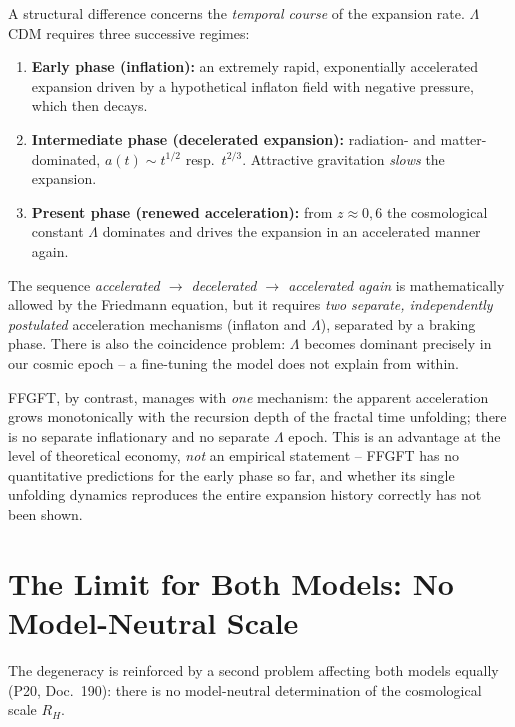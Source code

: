 A structural difference concerns the \emph{temporal course} of the
expansion rate. $\Lambda$CDM requires three successive regimes:

\begin{enumerate}
  \item \textbf{Early phase (inflation):} an extremely rapid, exponentially
        accelerated expansion driven by a hypothetical inflaton field with
        negative pressure, which then decays.
  \item \textbf{Intermediate phase (decelerated expansion):} radiation- and
        matter-dominated, $a(t) \sim t^{1/2}$ resp.\ $t^{2/3}$. Attractive
        gravitation \emph{slows} the expansion.
  \item \textbf{Present phase (renewed acceleration):} from $z \approx 0{,}6$
        the cosmological constant $\Lambda$ dominates and drives the
        expansion in an accelerated manner again.
\end{enumerate}

The sequence \emph{accelerated $\to$ decelerated $\to$ accelerated again} is
mathematically allowed by the Friedmann equation, but it requires \emph{two
separate, independently postulated} acceleration mechanisms (inflaton and
$\Lambda$), separated by a braking phase. There is also the coincidence
problem: $\Lambda$ becomes dominant precisely in our cosmic epoch -- a
fine-tuning the model does not explain from within.

FFGFT, by contrast, manages with \emph{one} mechanism: the apparent
acceleration grows monotonically with the recursion depth of the fractal
time unfolding; there is no separate inflationary and no separate $\Lambda$
epoch. This is an advantage at the level of theoretical economy, \emph{not}
an empirical statement -- FFGFT has no quantitative predictions for the
early phase so far, and whether its single unfolding dynamics reproduces the
entire expansion history correctly has not been shown.

\section{The Limit for Both Models: No Model-Neutral Scale}

The degeneracy is reinforced by a second problem affecting both models
equally (P20, Doc.~190): there is no model-neutral determination of the
cosmological scale $R_H$.

